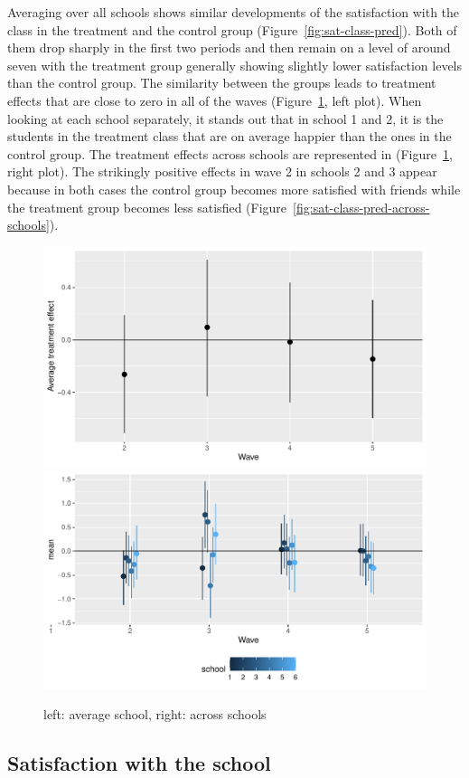 \documentclass[a4, 12pt]{article}
\begin{document}
\label{sec:results-class}
Averaging over all schools shows similar developments of the satisfaction with the class in the treatment and the control group (Figure~\ref{fig:sat-class-pred}). Both of them drop sharply in the first two periods and then remain on a level of around seven with the treatment group generally showing slightly lower satisfaction levels than the control group. The similarity between the groups leads to treatment effects that are close to zero in all of the waves (Figure~\ref{fig:class}, left plot).
When looking at each school separately, it stands out that in school 1 and 2, it is the students in the treatment class that are on average happier than the ones in the control group. The treatment effects across schools are represented in (Figure~\ref{fig:class}, right plot). The strikingly positive effects in wave 2 in schools 2 and 3 appear because in both cases the control group becomes more satisfied with friends while the treatment group becomes less satisfied (Figure~\ref{fig:sat-class-pred-across-schools}).

\begin{figure}[H]
\includegraphics[width=0.5\linewidth,]{../figures/sat_class_teff} \includegraphics[width=0.5\linewidth,]{../figures/sat_class_teff_across_schools} \caption{left: average school, right: across schools}\label{fig:class}
\end{figure}

\hypertarget{satisfaction-with-the-school}{%
\subsection{Satisfaction with the school}\label{satisfaction-with-the-school}}
\end{document}
